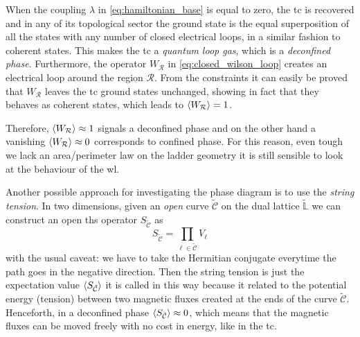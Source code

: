 When the coupling $\lambda$ in \eqref{eq:hamiltonian_base} is equal to zero, the \ac{tc} is recovered and in any of its topological sector the ground state is the equal superposition of all the states with any number of closed electrical loops, in a similar fashion to coherent states.
This makes the \ac{tc} a \emph{quantum loop gas}, which is a \emph{deconfined phase}.
Furthermore, the operator $W_{\mathcal{R}}$ in \eqref{eq:closed_wilson_loop} creates an electrical loop around the region $\mathcal{R}$.
From the constraints
it can easily be proved that $W_{\mathcal{R}}$ leaves the \ac{tc} ground states unchanged, showing in fact that they behaves as coherent states, which leads to $\ev{W_{\mathcal{R}}} = 1$.

Therefore, $\ev{W_{\mathcal{R}}} \approx 1$ signals a deconfined phase and on the other hand a vanishing $\ev{W_{\mathcal{R}}} \approx 0$ corresponds to confined phase.
For this reason, even tough we lack an area/perimeter law on the ladder geometry it is still sensible to look at the behaviour of the \ac{wl}.


Another possible approach for investigating the phase diagram is to use the \emph{string tension}.
In two dimensions, given an \emph{open} curve $\tilde{\mathcal{C}}$ on the dual lattice $\tilde{\mathbb{L}}$ we can construct an open \ac{ths} operator $S_{\tilde{\mathcal{C}}}$ as
\begin{equation}
    S_{\tilde{\mathcal{C}}} = \prod_{\ell \in \tilde{\mathcal{C}}} V_{\ell}
\end{equation}
with the usual caveat: we have to take the Hermitian conjugate everytime the path goes in the negative direction.
Then the string tension is just the expectation value $\ev{S_{\tilde{\mathcal{C}}}}$ it is called in this way because it related to the potential energy (tension) between two magnetic fluxes created at the ends of the curve $\tilde{\mathcal{C}}$.
Henceforth, in a deconfined phase $\ev{S_{\tilde{\mathcal{C}}}} \approx 0$, which means that the magnetic fluxes can be moved freely with no cost in energy, like in the \ac{tc}.


